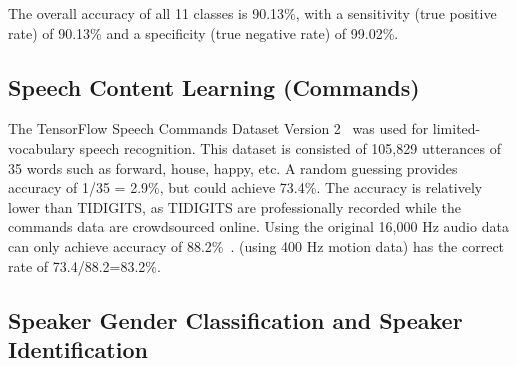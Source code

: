 The overall accuracy of all 11 classes is 90.13\%, with a sensitivity (true positive rate) of 90.13\% and a specificity (true negative rate) of 99.02\%.


\subsection{Speech Content Learning  (Commands)}\label{sec:word}
The TensorFlow Speech Commands Dataset Version 2~\cite{warden2018speech} was used for limited-vocabulary speech recognition. This dataset is consisted of 105,829 utterances of 35 words such as forward, house, happy, etc. A random guessing provides accuracy of 1/35 = 2.9\%, but {\systemName} could achieve 73.4\%. The accuracy is relatively lower than TIDIGITS, as TIDIGITS are professionally recorded while the commands data are crowdsourced online. Using the original 16,000 Hz audio data  can only achieve accuracy of 88.2\%~\cite{warden2018speech}. {\systemName} (using 400 Hz motion data) has the correct rate of 73.4/88.2=83.2\%.

\subsection{Speaker Gender Classification and Speaker Identification}


